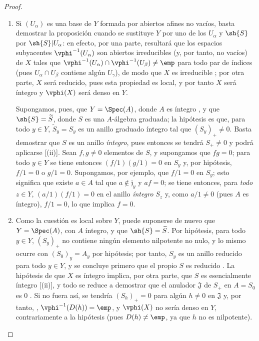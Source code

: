 \documentclass[oneside,10pt]{amsart}
\newcommand{\oldpage}[2][]{\marginnote{\normalfont\footnotesize\textbf{#1}~|~#2}\ignorespaces}
\begin{document}
\begin{proof}
\medskip\noindent
\begin{enumerate}
  \item[(i)] Si $(U_\alpha)$ es una base de $Y$ formada por abiertos afines no vacíos, basta demostrar la proposición cuando se sustituye $Y$ por uno de los $U_\alpha$ y $\sh{S}$ por $\sh{S}|U_\alpha$: en efecto, por una parte, resultará que los espacios subyacentes $\vphi^{-1}(U_\alpha)$ son abiertos irreducibles (y, por tanto, no vacíos) de $X$ tales que $\vphi^{-1}(U_\alpha)\cap\vphi^{-1}(U_\beta)\neq\emp$ para todo par de índices (pues $U_\alpha\cap U_\beta$ contiene algún $U_\gamma$), de modo que $X$ es irreducible ; por otra parte, $X$ será reducido, pues esta propiedad es local, y por tanto $X$ será íntegro y $\vphi(X)$ será denso en $Y$.

    Supongamos, pues, que $Y=\Spec(A)$, donde $A$ es íntegro , y que $\sh{S}=\widetilde{S}$, donde $S$ es una $A$-álgebra graduada; la hipótesis es que, para todo $y\in Y$, $\widetilde{S}_y=S_y$ es un anillo graduado íntegro tal que $(S_y)_+\neq0$.
    Basta demostrar que $S$ es un anillo \emph{íntegro}, pues entonces se tendrá $S_+\neq0$ y podrá aplicarse [(ii)].
    Sean $f,g\neq0$ elementos de $S$, y supongamos que $fg=0$; para todo $y\in Y$ se tiene entonces $(f/1)(g/1)=0$ en $S_y$ y, por hipótesis, $f/1=0$ o $g/1=0$.
    Supongamos, por ejemplo, que $f/1=0$ en $S_y$; esto significa que existe $a\in A$ tal que $a\notin\mathfrak{j}_y$ y $af=0$; se tiene entonces, para \emph{todo} $z\in Y$, $(a/1)(f/1)=0$ en el anillo \emph{íntegro} $S_z$ y, como $a/1\neq0$ (pues $A$ es íntegro), $f/1=0$, lo que implica $f=0$.
  \item[(ii)] Como la cuestión es local sobre $Y$, puede suponerse de nuevo que $Y=\Spec(A)$, con $A$ íntegro, y que $\sh{S}=\widetilde{S}$.
    Por hipótesis, para todo $y\in Y$, $(S_y)_+$ no contiene ningún elemento nilpotente no nulo, y lo mismo ocurre con $(S_0)_y=A_y$ por hipótesis; por tanto, $S_y$ es un anillo reducido para todo $y\in Y$, y se concluye primero que el propio $S$ es reducido .
    La hipótesis de que $X$ es íntegro implica, por otra parte, que $S$ es esencialmente íntegro [(ii)], y todo se reduce a demostrar que el anulador $\mathfrak{J}$ de $S_+$ en $A=S_0$ es $0$ .
    Si no fuera así, se tendría $(S_h)_+=0$ para algún $h\neq0$ en $\mathfrak{J}$ y, por tanto, , $\vphi^{-1}(D(h))=\emp$, y $\vphi(X)$ no sería denso en $Y$, contrariamente a la hipótesis (pues $D(h)\neq\emp$, ya que $h$ no es nilpotente).
\oldpage[II]{54}
\end{enumerate}
\end{proof}
\end{document}
